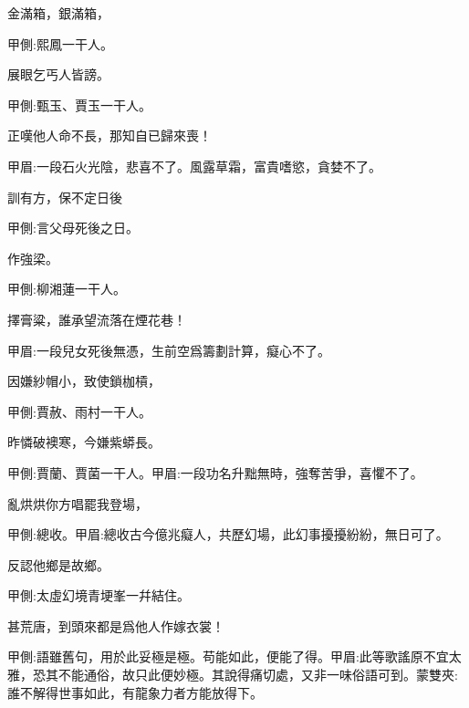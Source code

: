 \begin{poem}
    \begin{pl}金滿箱，銀滿箱，\end{pl}\begin{note}甲側:熙鳳一干人。\end{note}

    \begin{pl}展眼乞丐人皆謗。\end{pl}\begin{note}甲側:甄玉、賈玉一干人。\end{note}

    \begin{pl}正嘆他人命不長，那知自已歸來喪！\end{pl}\begin{note}甲眉:一段石火光陰，悲喜不了。風露草霜，富貴嗜慾，貪婪不了。\end{note}

    \begin{pl}訓有方，保不定日後\end{pl}\begin{note}甲側:言父母死後之日。\end{note}作強梁。\begin{note}甲側:柳湘蓮一干人。\end{note}

    \begin{pl}擇膏粱，誰承望流落在煙花巷！\end{pl}\begin{note}甲眉:一段兒女死後無憑，生前空爲籌劃計算，癡心不了。\end{note}

    \begin{pl}因嫌紗帽小，致使鎖枷槓，\end{pl}\begin{note}甲側:賈赦、雨村一干人。\end{note}

    \begin{pl}昨憐破襖寒，今嫌紫蟒長。\end{pl}\begin{note}甲側:賈蘭、賈菌一干人。甲眉:一段功名升黜無時，強奪苦爭，喜懼不了。\end{note}
    \begin{pl}亂烘烘你方唱罷我登場，\end{pl}\begin{note}甲側:總收。甲眉:總收古今億兆癡人，共歷幻場，此幻事擾擾紛紛，無日可了。\end{note}

    \begin{pl}反認他鄉是故鄉。\end{pl}\begin{note}甲側:太虛幻境青埂峯一幷結住。\end{note}

    \begin{pl}甚荒唐，到頭來都是爲他人作嫁衣裳！\end{pl}\begin{note}甲側:語雖舊句，用於此妥極是極。苟能如此，便能了得。甲眉:此等歌謠原不宜太雅，恐其不能通俗，故只此便妙極。其說得痛切處，又非一味俗語可到。蒙雙夾:誰不解得世事如此，有龍象力者方能放得下。\end{note}
\end{poem}


